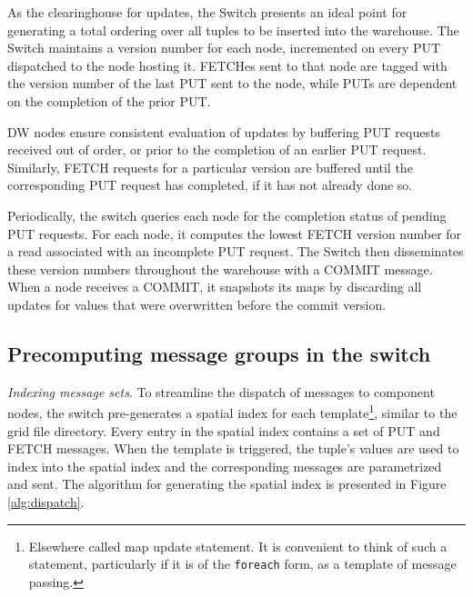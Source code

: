 As the clearinghouse for updates, the Switch presents an ideal point for generating a total ordering over all tuples to be inserted into the warehouse.  The Switch maintains a version number for each node, incremented on every PUT dispatched to the node hosting it.  FETCHes sent to that node are tagged with the version number of the last PUT sent to the node, while PUTs are dependent on the completion of the prior PUT.

DW nodes ensure consistent evaluation of updates by buffering PUT requests received out of order, or prior to the completion of an earlier PUT request.  Similarly, FETCH requests for a particular version are buffered until the corresponding PUT request has completed, if it has not already done so.

Periodically, the switch queries each node for the completion status of pending PUT requests.  For each node, it computes the lowest FETCH version number for a read associated with an incomplete PUT request.  The Switch then disseminates these version numbers throughout the warehouse with a COMMIT message.  When a node receives a COMMIT, it snapshots its maps by discarding all updates for values that were overwritten before the commit version.


\subsection{Precomputing message groups in the switch}

{\em Indexing message sets}.
To streamline the dispatch of messages to component nodes, the switch pre-generates a spatial index for each template\footnote{Elsewhere called map update statement. It is convenient to think of such a statement, particularly if it is of the {\tt foreach} form, as a template of message passing.}, similar to the grid file directory.  Every entry in the spatial index contains a set of PUT and FETCH messages.  When the template is triggered, the tuple's values are used to index into the spatial index and the corresponding messages are parametrized and sent.  The algorithm for generating the spatial index is presented in Figure \ref{alg:dispatch}.
